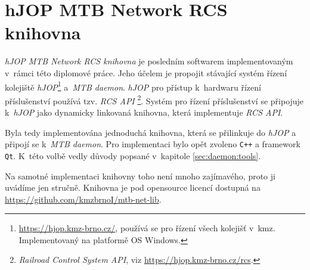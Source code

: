 \newpage
\section{hJOP MTB Network RCS knihovna} \label{sec:mtb-net-lib}

\textit{hJOP MTB Network RCS knihovna} je posledním softwarem implementovaným
v~rámci této diplomové práce. Jeho účelem je propojit stávající systém řízení
kolejiště \textit{hJOP}\footnote{\url{https://hjop.kmz-brno.cz/}, používá se
pro řízení všech kolejišť v~\gls{kmz}. Implementovaný na platformě OS Windows.}
a~\textit{MTB daemon}. \textit{hJOP} pro přístup k~hardwaru řízení
příslušenství používá tzv. \textit{RCS API} \footnote{\textit{Railroad Control
System API}, viz \url{https://hjop.kmz-brno.cz/rcs}.}. Systém pro řízení
příslušenství se připojuje k~\textit{hJOP} jako dynamicky linkovaná knihovna,
která implementuje \textit{RCS API}.

Byla tedy implementována jednoduchá knihovna, která se přilinkuje do
\textit{hJOP} a připojí se k~\textit{MTB daemon}. Pro implementaci bylo
opět zvoleno \texttt{C++} a framework \texttt{Qt}. K~této volbě vedly důvody
popsané v~kapitole \ref{sec:daemon:tools}.

Na samotné implementaci knihovny toho není mnoho zajímavého, proto ji uvádíme
jen stručně. Knihovna je pod opensource licencí dostupná na
\url{https://github.com/kmzbrnoI/mtb-net-lib}.
